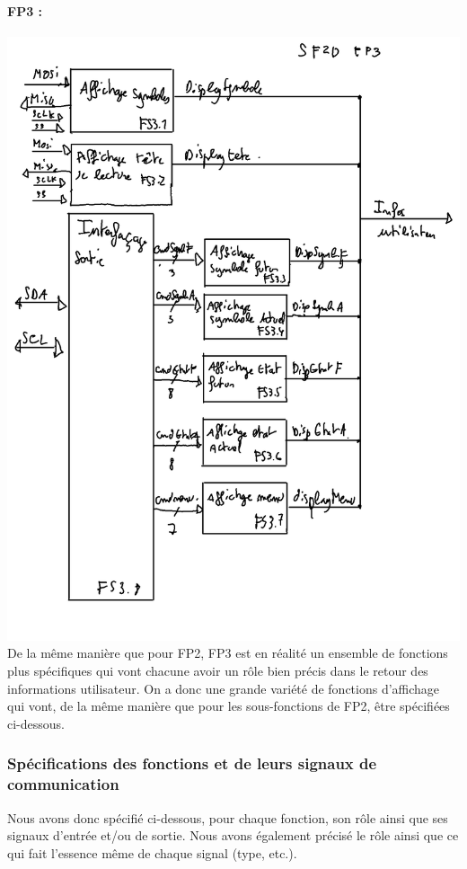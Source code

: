 \documentclass[12pt]{report}
\begin{document}
	\paragraph{FP3 :}
	\includegraphics[width=\textwidth]{img/SF2DFP3}
	De la même manière que pour FP2, FP3 est en réalité un ensemble de fonctions plus spécifiques qui vont chacune avoir un rôle bien précis dans le retour des informations utilisateur. On a donc une grande variété de fonctions d'affichage qui vont, de la même manière que pour les sous-fonctions de FP2, être spécifiées ci-dessous.
	\subsubsection{Spécifications des fonctions et de leurs signaux de communication}
	Nous avons donc spécifié ci-dessous, pour chaque fonction, son rôle ainsi que ses signaux d'entrée et/ou de sortie. Nous avons également précisé le rôle ainsi que ce qui fait l'essence même de chaque signal (type, etc.).
	
\end{document}
